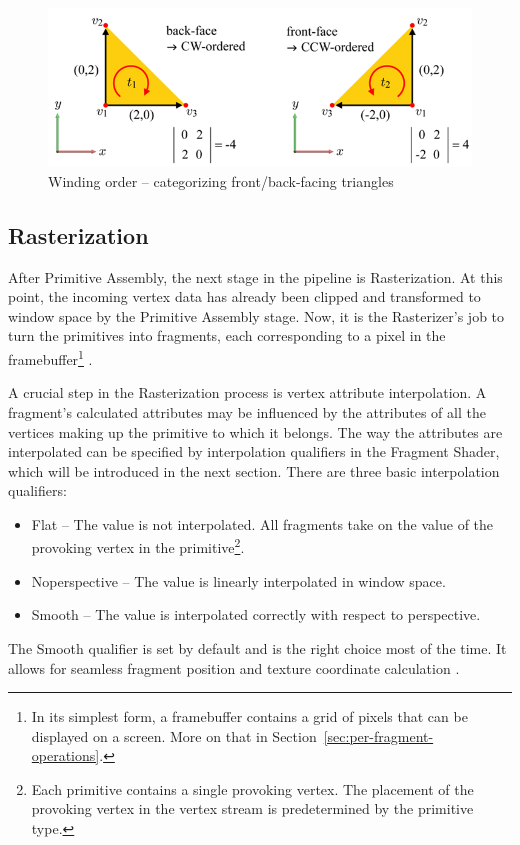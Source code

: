 \documentclass[
  digital,     %
  oneside,     %
  nosansbold,  %
  nocolorbold, %
  lof,         %
  lot,         %
]{fithesis4}
\begin{document}
\begin{figure}[H]
    \centering
    \includegraphics[height=0.32\linewidth]{images/tizen_front_back_face.png}
    \caption{Winding order -- categorizing front/back-facing triangles \cite{tizen-face-culling}}
    \label{fig:tizen-front-back-face}
\end{figure}

\subsection{Rasterization}
After Primitive Assembly, the next stage in the pipeline is Rasterization. At this point, the incoming vertex data
has already been clipped and transformed to window space by the Primitive Assembly stage. Now, it is the Rasterizer's
job to turn the primitives into fragments, each corresponding to a pixel in the framebuffer\footnote{In its simplest
form, a framebuffer contains a grid of pixels that can be displayed on a screen. More on that in
Section~\ref{sec:per-fragment-operations}.} \cite[p.14]{opengl-book}.

A crucial step in the Rasterization process is vertex attribute interpolation. A fragment's calculated attributes
may be influenced by the attributes of all the vertices making up the primitive to which it belongs.
The way the attributes are interpolated can be specified by interpolation qualifiers in the Fragment Shader,
which will be introduced in the next section. There are three basic interpolation qualifiers:
\begin{itemize}
    \item Flat -- The value is not interpolated. All fragments take on the value of the provoking vertex
    in the primitive\footnote{Each primitive contains a single provoking vertex.
    The placement of the provoking vertex in the vertex stream is predetermined by the primitive type.}.
    \item Noperspective -- The value is linearly interpolated in window space.
    \item Smooth -- The value is interpolated correctly with respect to perspective.
\end{itemize}
The Smooth qualifier is set by default and is the right choice most of the time. It allows for seamless
fragment position and texture coordinate calculation \cite{openglwiki-interpolation}.
\end{document}
